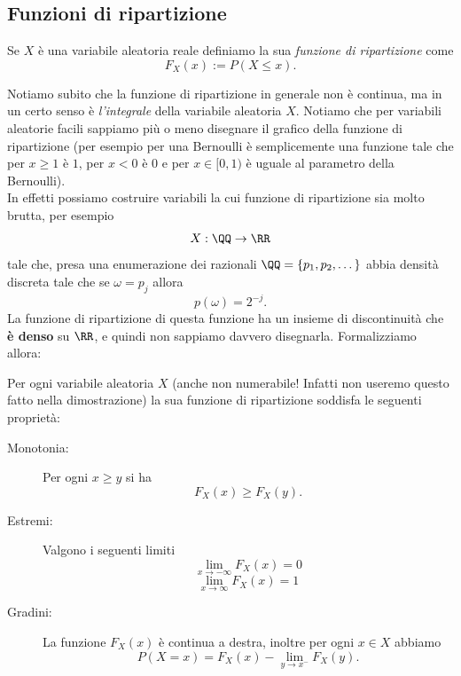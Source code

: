 \documentclass[11pt]{scrartcl}
\begin{document}
	\subsection{Funzioni di ripartizione}
	\begin{definition}
		Se $X$ è una variabile aleatoria reale definiamo la sua \textit{funzione di ripartizione} come
		$$F_X(x):=P(X\le x).$$
	\end{definition}
	Notiamo subito che la funzione di ripartizione in generale non è continua, ma in un certo senso è \textit{l'integrale} della variabile aleatoria $X$. Notiamo che per variabili aleatorie facili sappiamo più o meno disegnare il grafico della funzione di ripartizione (per esempio per una Bernoulli è semplicemente una funzione tale che per $x\ge 1$ è $1$, per $x<0$ è $0$ e per $x\in [0,1)$ è uguale al parametro della Bernoulli).  \\
	In effetti possiamo costruire variabili la cui funzione di ripartizione sia molto brutta, per esempio 
	$$X:\QQ\to\RR$$
	tale che, presa una enumerazione dei razionali $\QQ=\left\{p_1,p_2,\dots\right\}$ abbia densità discreta tale che se $\omega=p_j$ allora
	$$p(\omega)=2^{-j}.$$
	La funzione di ripartizione di questa funzione ha un insieme di discontinuità che \textbf{è denso} su $\RR$, e quindi non sappiamo davvero disegnarla. Formalizziamo allora:
	\begin{proposition}
		Per ogni variabile aleatoria $X$ (anche non numerabile! Infatti non useremo questo fatto nella dimostrazione) la sua funzione di ripartizione soddisfa le seguenti proprietà:
		\begin{description}
			\item[Monotonia:] Per ogni $x\ge y$ si ha
			$$F_X(x)\ge F_X(y).$$
			\item[Estremi:] Valgono i seguenti limiti
			$$\lim_{x\to -\infty}F_X(x)=0$$
			$$\lim_{x\to\infty}F_X(x)=1$$
			\item[Gradini:] La funzione $F_X(x)$ è continua a destra, inoltre per ogni $x\in X$ abbiamo
			$$P(X=x)=F_X(x)-\lim_{y\to x^{-}}F_X(y).$$
		\end{description}
	\end{proposition}
\end{document}
